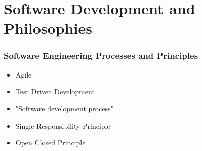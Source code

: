 

\part*{Software Development and Philosophies}




\toclineskip
\section{Software Engineering Processes and Principles}


\begin{itemize}
	\item Agile
	\item Test Driven Development
	\item "Software development process"
	\item Single Responsibility Principle
	\item Open Closed Principle
\end{itemize}


